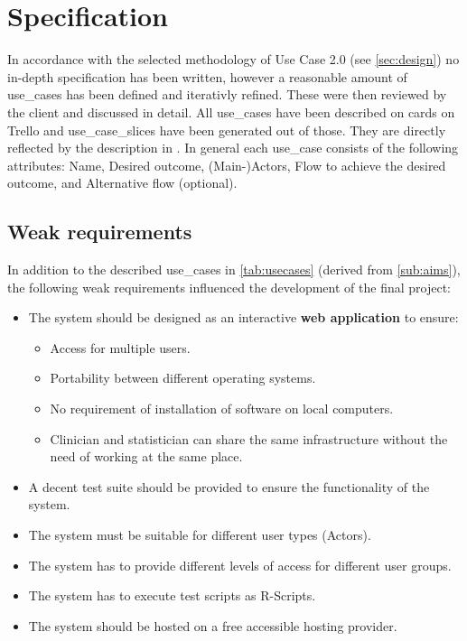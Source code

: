 \section{Specification}
\label{sec:specification}

In accordance with the selected methodology of Use Case 2.0 (see \autoref{sec:design}) no in-depth specification has been written, however a reasonable amount of \glspl{use_case} has been defined and iterativly refined. These were then reviewed by the client and discussed in detail. All \glspl{use_case} have been described on cards on Trello and \glspl{use_case_slice} have been generated out of those. They are directly reflected by the description in \cite{sassoon2016,sassoon2014, sassoon2016CD}. In general each \gls{use_case} consists of the following attributes: Name, Desired outcome, (Main-)\Glspl{Actor}, Flow to achieve the desired outcome, and Alternative flow (optional).


\subsection{Weak requirements}
\label{sub:weak}
In addition to the described \glspl{use_case} in \autoref{tab:usecases} (derived from \autoref{sub:aims}), the following weak requirements influenced the development of the final project:


\begin{itemize}
	\item The system should be designed as an interactive \textbf{web application} to ensure:
	\begin{itemize}
		\item Access for multiple users.
		\item Portability between different operating systems.
		\item No requirement of installation of software on local computers.
		\item Clinician and statistician can share the same infrastructure without the need of working at the same place.
	\end{itemize}
	\item A decent test suite should be provided to ensure the functionality of the system.
	\item The system must be suitable for different user types (\glspl{Actor}).
	\item The system has to provide different levels of access for different user groups.
	\item The system has to execute test scripts as \gls{R}-Scripts.
	\item The system should be hosted on a free accessible hosting provider.
\end{itemize}


